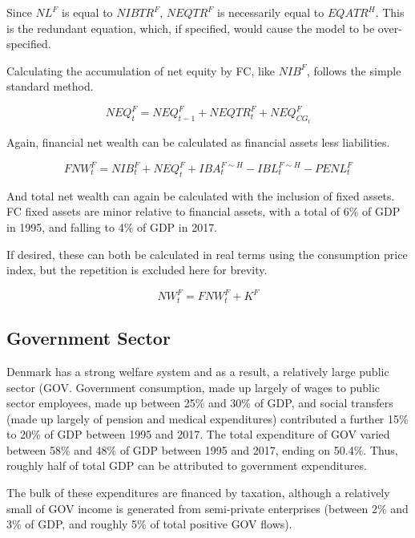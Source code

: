 \documentclass[
]{book}
\begin{document}
Since \(NL^F\) is equal to \(NIBTR^F\), \(NEQTR^F\) is necessarily equal to \(EQATR^H\). This is the redundant equation, which, if specified, would cause the model to be over-specified.

Calculating the accumulation of net equity by FC, like \(NIB^F\), follows the simple standard method.

\begin{equation}
NEQ^F_t = NEQ^F_{t-1} + NEQTR^F_t + NEQ^F_{CG_t}
\end{equation}

Again, financial net wealth can be calculated as financial assets less liabilities.

\begin{equation}
FNW^F_t = NIB^F_t + NEQ^F_t + IBA^{F\sim H}_t - IBL^{F\sim H}_t - PENL^F_t
\end{equation}

And total net wealth can again be calculated with the inclusion of fixed assets.
FC fixed assets are minor relative to financial assets, with a total of
6\% of GDP in 1995, and falling to 4\% of GDP in 2017.

If desired, these can both be calculated in real terms using the consumption
price index, but the repetition is excluded here for brevity.

\begin{equation}
NW^F_t = FNW^F_t + K^F
\end{equation}

\hypertarget{sec:fi-fl-sfc-model-eq-GOV}{%
\subsection{Government Sector}\label{sec:fi-fl-sfc-model-eq-GOV}}

Denmark has a strong welfare system and as a result, a relatively large public sector (GOV.
Government consumption, made up largely of wages to public sector employees, made up
between 25\% and 30\% of GDP, and social transfers (made up largely of pension and
medical expenditures) contributed a further 15\% to 20\% of GDP between
1995 and 2017. The total expenditure of GOV varied between 58\% and 48\% of
GDP between 1995 and 2017, ending on 50.4\%. Thus, roughly half of total GDP can be attributed
to government expenditures.

The bulk of these expenditures are financed by taxation, although a
relatively small of GOV income is generated from semi-private
enterprises (between 2\% and 3\% of GDP, and roughly 5\% of total
positive GOV flows).
\end{document}
